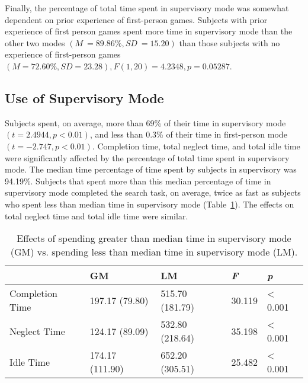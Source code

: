 Finally, the percentage of total time spent in supervisory mode was somewhat dependent on prior experience of first-person games. Subjects with prior experience of first person games spent more time in supervisory mode than the other two modes $(M~=89.86\%, SD~=15.20)$ than those subjects with no experience of first-person games $(M=72.60\%, SD=23.28), F(1,20)=4.2348, p=0.05287$.


\subsection{Use of Supervisory Mode} %
\label{sub:use_of_supervisory_mode}

Subjects spent, on average, more than 69\% of their time in supervisory mode $(t = 2.4944, p < 0.01)$, and less than 0.3\% of their time in first-person mode $(t = -2.747, p < 0.01)$.
Completion time, total neglect time, and total idle time were significantly affected by the percentage of total time spent in supervisory mode. The median time percentage of time spent by subjects in supervisory was 94.19\%. Subjects that spent more than this median percentage of time in supervisory mode completed the search task, on average, twice as fast as subjects who spent less than median time in supervisory mode (Table~\ref{tab:supervisory}). The effects on total neglect time and total idle time were similar.


\begin{table}[ht]
\label{tab:supervisory}
\begin{center}
	\begin{tabular}{| l | l | l | l | l |}
	\hline
		& \textbf{GM} & \textbf{LM} & \emph{F} & \emph{p}\\ \hline
		Completion Time & 197.17 (79.80) & 515.70 (181.79) & 30.119 & < 0.001\\ \hline
		Neglect Time & 124.17 (89.09) & 532.80 (218.64) & 35.198 & < 0.001\\ \hline
		Idle Time & 174.17 (111.90) & 652.20 (305.51) & 25.482 & < 0.001\\ \hline
	\hline
	\end{tabular}
	\caption{Effects of spending greater than median time in supervisory mode (GM) vs. spending less than median time in supervisory mode (LM).}
\end{center}
\end{table}

